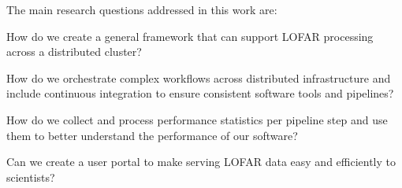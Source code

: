 The main research questions addressed in this work are:

How do we create a general framework that can support LOFAR processing across a distributed cluster?

How do we orchestrate complex workflows across distributed infrastructure and include continuous integration to ensure consistent software tools and pipelines?

How do we collect and process performance statistics per pipeline step and use them to better understand the performance of our software?

Can we create a user portal to make serving LOFAR data easy and efficiently to scientists?






